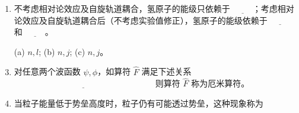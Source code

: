 \begin{enumerate}
    \item 不考虑相对论效应及自旋轨道耦合，氢原子的能级只依赖于 $\underline{\hspace{1cm}}$；考虑相对论效应及自旋轨道耦合后（不考虑实验值修正），氢原子的能级依赖于 $\underline{\hspace{1cm}}$ 和 $\underline{\hspace{1cm}}$。

    \item [(a)] $n, l$; \quad (b) $n, j$; \quad (c) $n, j$。

    \item 对任意两个波函数 $\psi, \phi$，如算符 $\hat{F}$ 满足下述关系 $\underline{\hspace{7cm}}$ 则算符 $\hat{F}$ 称为厄米算符。

    \item 当粒子能量低于势垒高度时，粒子仍有可能透过势垒，这种现象称为 
\end{enumerate}